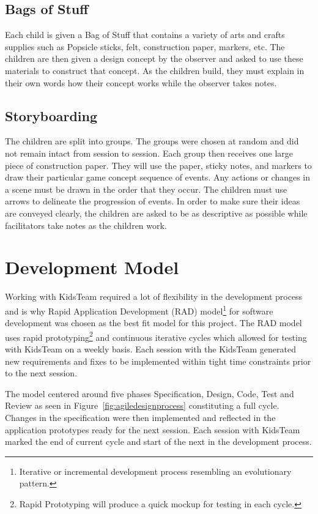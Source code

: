\subsection{Bags of Stuff} \label{sec:bagsofstuff}
Each child is given a Bag of Stuff that contains a variety of arts and crafts supplies such as Popsicle sticks, felt, construction paper, markers, etc. The children are then given a design concept by the observer and asked to use these materials to construct that concept. As the children build, they must explain in their own words how their concept works while the observer takes notes. \cite{Druin:1999:CID:302979.303166}\cite{Druin02therole}

\subsection{Storyboarding}\label{sec:storyboarding}

The children are split into groups. The groups were chosen at random and did not remain intact from session to session. Each group then receives one large piece of construction paper. They will use the paper, sticky notes, and markers to draw their particular game concept sequence of events. Any actions or changes in a scene must be drawn in the order that they occur. The children must use arrows to delineate the progression of events. In order to make sure their ideas are conveyed clearly, the children are asked to be as descriptive as possible while facilitators take notes as the children work. \cite{Druin:1999:CID:302979.303166}\cite{Druin02therole}

\section{Development Model}
Working with KidsTeam required a lot of flexibility in the development process and is why Rapid Application Development (RAD) model\footnote{Iterative or incremental development process resembling an evolutionary pattern.} for software development was chosen as the best fit model for this project. The RAD model uses rapid prototyping\footnote{Rapid Prototyping will produce a quick mockup for testing in each cycle.} and continuous iterative cycles which allowed for testing with KidsTeam on a weekly basis. Each session with the KidsTeam generated new requirements and fixes to be implemented within tight time constraints prior to the next session.

The model centered around five phases Specification, Design, Code, Test and Review as seen in Figure~\ref{fig:agiledesignprocess} constituting a full cycle. Changes in the specification were then implemented and reflected in the application prototypes ready for the next session. Each session with KidsTeam marked the end of current cycle and start of the next in the development process. \cite{0136061699}\cite{Ruparelia:2010:SDL:1764810.1764814}

